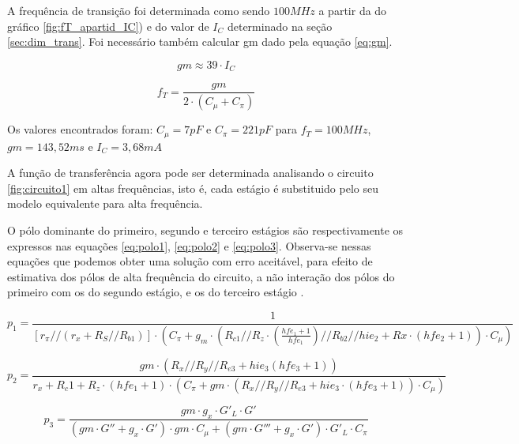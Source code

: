 \documentclass[openright]{normas-utf-tex} %
\begin{document}
A frequência de transição foi determinada como sendo $100 MHz$ a partir da do gráfico \ref{fig:fT_apartid_IC})  e do valor de $I_C$ determinado na seção \ref{sec:dim_trans}. Foi necessário também calcular gm dado pela equação \ref{eq:gm}.



\begin{equation}\label{eq:gm}
gm \approx 39 \cdot I_C
\end{equation}


\begin{equation} \label{eq:freq_trans}
f_T = \frac{gm}{2 \cdot \left(C_{\mu} + C_{\pi}\right)}
\end{equation}

Os valores encontrados foram: $C_\mu = 7 pF$ e $C_\pi = 221 pF $ para $f_T = 100 M Hz$, $gm = 143,52 m s$ e $I_C = 3,68 mA$

A função de transferência agora pode ser determinada analisando o circuito \ref{fig:circuito1} em altas frequências, isto é, cada estágio é substituido pelo seu modelo equivalente para alta frequência.

O pólo dominante do primeiro, segundo e terceiro estágios são respectivamente os expressos nas equações
\ref{eq:polo1}, \ref{eq:polo2} e \ref{eq:polo3}. Observa-se nessas equações que podemos obter uma solução com erro aceitável, para efeito de estimativa dos pólos de alta frequência do circuito, a não interação dos pólos do primeiro com os do segundo estágio, e os do terceiro estágio \cite{millman}.


\begin{equation}\label{eq:polo1}
p_1 = \frac{1}{ \left[r_{\pi}//\left(r_x+ R_S//R_{b1}\right)\right]   
\cdot \left(C_\pi+g_m \cdot   \left(R_{c1}//R_z \cdot \left(\frac{hfe_1+1}{hfe_1}\right)  //R_{b2}//hie_2 + Rx \cdot \left( hfe_2 + 1 \right) \right) \cdot C_{\mu}\right)}
\end{equation}



\begin{equation}\label{eq:polo2}
p_2 = \frac{gm \cdot \left( R_x//R_y//R_{e3} + hie_3 \left(hfe_3+1\right)\right) }{r_x+ R_c1 + R_z \cdot \left(hfe_1+1\right) \cdot \left( C_{\pi} + gm \cdot \left( R_x//R_y//R_{e3} + hie_3 \cdot \left(hfe_3+1\right)\right)  \cdot C_{\mu}\right)}
\end{equation}


\begin{equation}\label{eq:polo3}
p_3 = \frac{gm \cdot g_x \cdot G'_L \cdot G'}{\left(gm \cdot G''+ g_x \cdot G'\right) \cdot gm \cdot C_{\mu} +\left(gm \cdot G'''+ g_x \cdot G'\right) \cdot G'_L \cdot C_{\pi}}
\end{equation}
\end{document}
